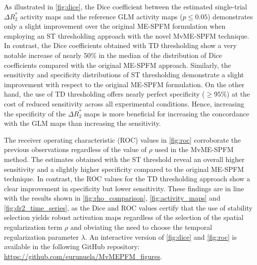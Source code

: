 As illustrated in \cref{fig:dice}, the Dice coefficient between the
estimated single-trial $\Delta R_2^*$ activity maps and the reference GLM
activity maps ($p \leq 0.05$) demonstrates only a slight improvement over the
original ME-SPFM formulation when employing an ST thresholding approach with the
novel MvME-SPFM technique. In contrast, the Dice coefficients obtained with TD
thresholding show a very notable increase of nearly 50\% in the median of the
distribution of Dice coefficients compared with the original ME-SPFM approach.
Similarly, the sensitivity and specificity distributions of ST thresholding
demonstrate a slight improvement with respect to the original ME-SPFM
formulation. On the other hand, the use of TD thresholding offers nearly perfect
specificity ($\geq 95\%$) at the cost of reduced sensitivity across all
experimental conditions. Hence, increasing the specificity of the $\Delta R_2^*$
maps is more beneficial for increasing the concordance with the GLM maps than
increasing the sensitivity. 

The receiver operating characteristic (ROC) values in \cref{fig:roc} corroborate
the previous observations regardless of the value of $\rho$ used in the
MvME-SPFM method. The estimates obtained with the ST threshold reveal an overall
higher sensitivity and a slightly higher specificity compared to the original
ME-SPFM technique. In contrast, the ROC values for the TD thresholding approach
show a clear improvement in specificity but lower sensitivity. These findings
are in line with the results shown in \cref{fig:rho_comparison},
\cref{fig:activity_maps} and \cref{fig:dr2_time_series}, as the Dice and ROC
values certify that the use of stability selection yields robust activation maps
regardless of the selection of the spatial regularization term $\rho$ and
obviating the need to choose the temporal regularization parameter $\lambda$. An
interactive version of \cref{fig:dice} and \cref{fig:roc} is available in the
following GitHub repository: \url{https://github.com/eurunuela/MvMEPFM_figures}.

